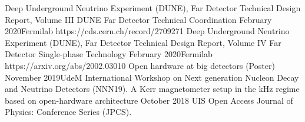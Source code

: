 \cvevent{} {Deep Underground Neutrino Experiment (DUNE), Far Detector Technical Design Report, Volume III DUNE Far Detector Technical Coordination}
{February 2020}{Fermilab}
https://cds.cern.ch/record/2709271
\cvevent{} {Deep Underground Neutrino Experiment (DUNE), Far Detector Technical Design Report, Volume IV Far Detector Single-phase Technology}
{February 2020}{Fermilab}
https://arxiv.org/abs/2002.03010
\cvevent{} {Open hardware at big detectors (Poster)}
{November 2019}{UdeM}
International Workshop on
Next generation Nucleon
Decay and Neutrino Detectors
(NNN19).
\cvevent{} {A Kerr magnetometer setup in the kHz regime based on open-hardware architecture}
{October 2018 }{UIS}
Open Access Journal of Physics: Conference Series (JPCS).



{}






